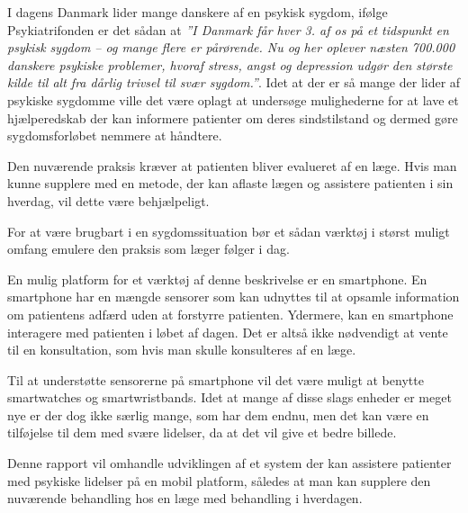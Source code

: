 


I dagens Danmark lider mange danskere af en psykisk sygdom, ifølge Psykiatrifonden er det sådan at \textit{''I Danmark får hver 3. af os på et tidspunkt en psykisk sygdom – og mange flere er pårørende. 
Nu og her oplever næsten 700.000 danskere psykiske problemer, hvoraf stress, angst og depression udgør den største kilde til alt fra dårlig trivsel til svær sygdom.''}\cite{psykiatrifonden}.
Idet at der er så mange der lider af psykiske sygdomme ville det være oplagt at undersøge mulighederne for at lave et hjælperedskab der kan informere patienter om deres sindstilstand og dermed gøre sygdomsforløbet nemmere at håndtere.

Den nuværende praksis kræver at patienten bliver evalueret af en læge.
Hvis man kunne supplere med en metode, der kan aflaste lægen og assistere patienten i sin hverdag, vil dette være behjælpeligt. 

For at være brugbart i en sygdomssituation bør et sådan værktøj i størst muligt omfang emulere den praksis som læger følger i dag.

En mulig platform for et værktøj af denne beskrivelse er en smartphone.
En smartphone har en mængde sensorer som kan udnyttes til at opsamle information om patientens adfærd uden at forstyrre patienten.
Ydermere, kan en smartphone interagere med patienten i løbet af dagen. 
Det er altså ikke nødvendigt at vente til en konsultation, som hvis man skulle konsulteres af en læge.

Til at understøtte sensorerne på smartphone vil det være muligt at benytte smartwatches og smartwristbands.
Idet at mange af disse slags enheder er meget nye er der dog ikke særlig mange, som har dem endnu, men det kan være en tilføjelse til dem med svære lidelser, da at det vil give et bedre billede.

Denne rapport vil omhandle udviklingen af et system der kan assistere patienter med psykiske lidelser på en mobil platform, således at man kan supplere den nuværende behandling hos en læge med behandling i hverdagen.